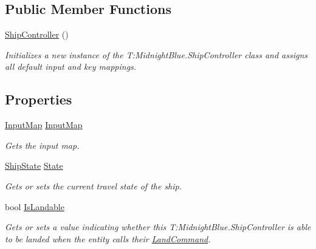 \subsection*{Public Member Functions}
\begin{DoxyCompactItemize}
\item 
\hyperlink{class_midnight_blue_1_1_ship_controller_a07d38d2b98b9b132f1eff9cc8879f278}{Ship\+Controller} ()
\begin{DoxyCompactList}\small\item\em Initializes a new instance of the T\+:\+Midnight\+Blue.\+Ship\+Controller class and assigns all default input and key mappings. \end{DoxyCompactList}\end{DoxyCompactItemize}
\subsection*{Properties}
\begin{DoxyCompactItemize}
\item 
\hyperlink{class_m_b2_d_1_1_i_o_1_1_input_map}{Input\+Map} \hyperlink{class_midnight_blue_1_1_ship_controller_a50136c59b5a0e80d280aec4b6de46414}{Input\+Map}
\begin{DoxyCompactList}\small\item\em Gets the input map. \end{DoxyCompactList}\item 
\hyperlink{namespace_midnight_blue_a46fd3250d826e0dec67892328d5b368c}{Ship\+State} \hyperlink{class_midnight_blue_1_1_ship_controller_a032da447be3b66b7998349ae825d4edb}{State}
\begin{DoxyCompactList}\small\item\em Gets or sets the current travel state of the ship. \end{DoxyCompactList}\item 
bool \hyperlink{class_midnight_blue_1_1_ship_controller_ad07cfa737db5a712aedcc2528b953683}{Is\+Landable}
\begin{DoxyCompactList}\small\item\em Gets or sets a value indicating whether this T\+:\+Midnight\+Blue.\+Ship\+Controller is able to be landed when the entity calls their \hyperlink{class_midnight_blue_1_1_land_command}{Land\+Command}. \end{DoxyCompactList}\end{DoxyCompactItemize}


